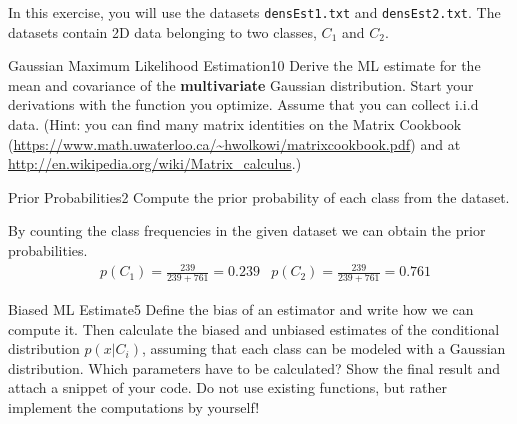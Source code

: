 \newif\ifvimbug
\vimbugfalse

\ifvimbug

\fi

In this exercise, you will use the datasets \texttt{densEst1.txt} 
and \texttt{densEst2.txt}. The datasets contain 2D data belonging
to two classes, $C_1$ and $C_2$.

\begin{questions}


\begin{question}{Gaussian Maximum Likelihood Estimation}{10}
Derive the ML estimate for the mean and covariance of the \textbf{multivariate} Gaussian distribution. Start your derivations with the function you optimize. Assume that you can collect i.i.d data. (Hint: you can find many matrix identities on the Matrix Cookbook (\url{https://www.math.uwaterloo.ca/~hwolkowi/matrixcookbook.pdf}) and at \url{http://en.wikipedia.org/wiki/Matrix_calculus}.)

\begin{answer}\end{answer}

\end{question}


\begin{question}{Prior Probabilities}{2}
Compute the prior probability of each class from the dataset. 

\begin{answer}
By counting the class frequencies in the given dataset we can obtain the prior probabilities.\\
\begin{align}
&p(C_{1})=\frac{239}{239+761}=0.239
&p(C_{2})=\frac{239}{239+761}=0.761
\end{align}
\end{answer}

\end{question}



\begin{question}{Biased ML Estimate}{5}
Define the bias of an estimator and write how we can compute it.
Then calculate the biased and unbiased estimates of the conditional distribution $p(x|C_i)$, assuming that each class can be modeled with a Gaussian distribution. Which parameters have to be calculated?
Show the final result and attach a snippet of your code.
Do not use existing functions, but rather implement the computations by yourself!


\end{question}
\end{questions}
